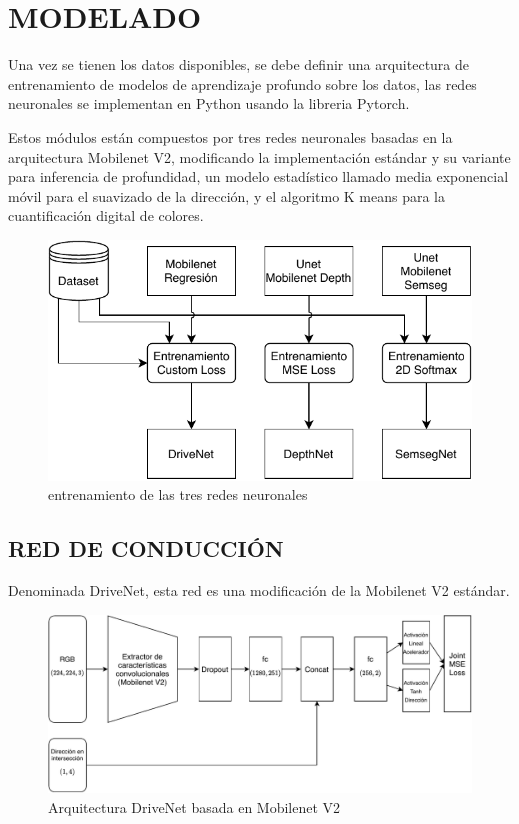 \section{MODELADO}
	Una vez se tienen los datos disponibles, se debe definir una arquitectura de entrenamiento de modelos de aprendizaje profundo sobre los datos, las redes neuronales se implementan en Python usando la libreria Pytorch.
	
	Estos módulos están compuestos por tres redes neuronales basadas en la arquitectura Mobilenet V2, modificando la implementación estándar y su variante para inferencia de profundidad, un modelo estadístico llamado media exponencial móvil para el suavizado de la dirección, y el algoritmo K means para la cuantificación digital de colores.
	
	\begin{figure}[H]
		\centering
		\includegraphics[scale=0.8]{imagenes/arquitectura_entrenamiento}
		\caption[Entrenamiento de tres redes neuronales]{entrenamiento de las tres redes neuronales}
		\label{training}
	\end{figure}
	
	\subsection{RED DE CONDUCCIÓN}
		Denominada DriveNet, esta red es una modificación de la Mobilenet V2 estándar.
		
		\begin{figure}[H]
			\centering
			\includegraphics[scale=0.7]{imagenes/drivenet}
			\caption[Arquitectura DriveNet basada en Mobilenet V2]{Arquitectura DriveNet basada en Mobilenet V2}
			\label{drivenet}
		\end{figure}
	
